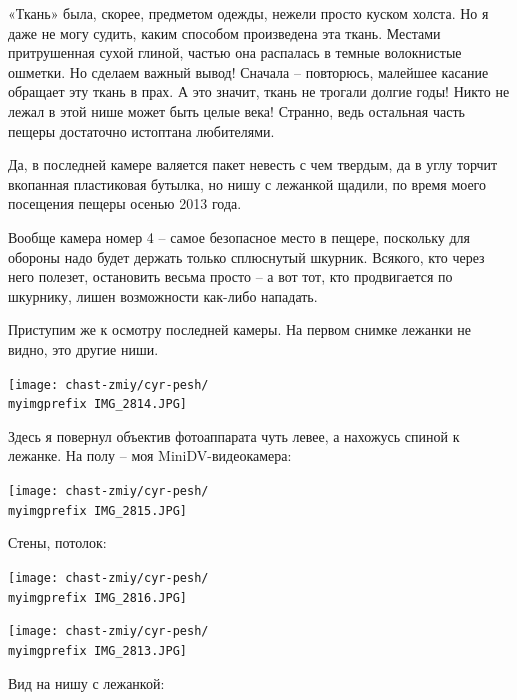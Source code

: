 «Ткань» была, скорее, предметом одежды, нежели просто куском холста. Но я даже не могу судить, каким способом произведена эта ткань. Местами притрушенная сухой глиной, частью она распалась в темные волокнистые ошметки. Но сделаем важный вывод! Сначала – повторюсь, малейшее касание обращает эту ткань в прах. А это значит, ткань не трогали долгие годы! Никто не лежал в этой нише может быть целые века! Странно, ведь остальная часть пещеры достаточно истоптана любителями.

Да, в последней камере валяется пакет невесть с чем твердым, да в углу торчит вкопанная пластиковая бутылка, но нишу с лежанкой щадили, по время моего посещения пещеры осенью 2013 года.
 
Вообще камера номер 4 – самое безопасное место в пещере, поскольку для обороны надо будет держать только сплюснутый шкурник. Всякого, кто через него полезет, остановить весьма просто – а вот тот, кто продвигается по шкурнику, лишен возможности как-либо нападать.

Приступим же к осмотру последней камеры. На первом снимке лежанки не видно, это другие ниши. 

\begin{center}
\texttt{[image: chast-zmiy/cyr-pesh/\\myimgprefix IMG\_2814.JPG]}
\end{center}

\newpage

Здесь я повернул объектив фотоаппарата чуть левее, а нахожусь спиной к лежанке. На полу – моя MiniDV-видеокамера:
\vspace*{\fill}
\begin{center}
\texttt{[image: chast-zmiy/cyr-pesh/\\myimgprefix IMG\_2815.JPG]}
\end{center}
\vspace*{\fill}
\newpage

Стены, потолок:

\begin{center}
\texttt{[image: chast-zmiy/cyr-pesh/\\myimgprefix IMG\_2816.JPG]}
\end{center}

\begin{center}
\texttt{[image: chast-zmiy/cyr-pesh/\\myimgprefix IMG\_2813.JPG]}
\end{center}

\newpage

Вид на нишу с лежанкой:

